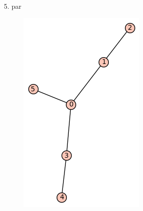 \documentclass[12pt, a4paper]{article}
\begin{document}
5. par

\begin{figure}[h!]
\centering
\includegraphics[width=\linewidth]{t-11}
\end{figure} \\
\end{document}
